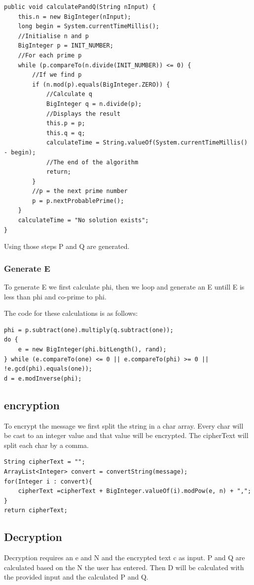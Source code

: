\begin{lstlisting}
public void calculatePandQ(String nInput) {
    this.n = new BigInteger(nInput);
    long begin = System.currentTimeMillis();
    //Initialise n and p
    BigInteger p = INIT_NUMBER;
    //For each prime p
    while (p.compareTo(n.divide(INIT_NUMBER)) <= 0) {
        //If we find p
        if (n.mod(p).equals(BigInteger.ZERO)) {
            //Calculate q
            BigInteger q = n.divide(p);
            //Displays the result
            this.p = p;
            this.q = q;
            calculateTime = String.valueOf(System.currentTimeMillis() - begin);
            //The end of the algorithm
            return;
        }
        //p = the next prime number
        p = p.nextProbablePrime();
    }
    calculateTime = "No solution exists";
}
\end{lstlisting}

Using those steps P and Q are generated.

\subsubsection{Generate E}
To generate E we first calculate phi, then we loop and generate an E untill E is
less than phi and co-prime to phi.

The code for these calculations is as follows:
\begin{lstlisting}
phi = p.subtract(one).multiply(q.subtract(one));
do {
    e = new BigInteger(phi.bitLength(), rand);
} while (e.compareTo(one) <= 0 || e.compareTo(phi) >= 0 || !e.gcd(phi).equals(one));
d = e.modInverse(phi);
\end{lstlisting}{}

\subsection{encryption}
To encrypt the message we first split the string in a char array.
Every char will be cast to an integer value and that value will be encrypted.
The cipherText will split each char by a comma.

\begin{lstlisting}
String cipherText = "";
ArrayList<Integer> convert = convertString(message);
for(Integer i : convert){
    cipherText =cipherText + BigInteger.valueOf(i).modPow(e, n) + ",";
}
return cipherText;
\end{lstlisting}{}

\subsection{Decryption}
Decryption requires an e and N and the encrypted text c as input.
P and Q are calculated based on the N the user has entered.
Then D will be calculated with the provided input and the calculated P and Q.

